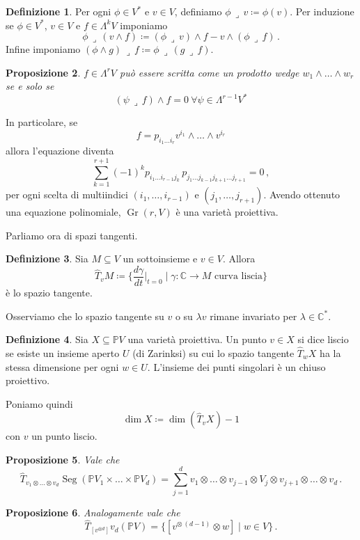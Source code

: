 \documentclass[a4paper, 11pt]{article}
\theoremstyle{definition}
\newtheorem{Def}{Definizione}[section]
\theoremstyle{plain}
\newtheorem{Prop}[Def]{Proposizione}
\newcommand{\PP}{\mathbb{P}}
\newcommand{\C}{\mathbb{C}}
\newcommand{\deff}{\coloneqq}
\DeclareMathOperator{\Gr}{Gr}
\DeclareMathOperator{\Seg}{Seg}
\begin{document}
\begin{Def}
	Per ogni $\phi \in V^\ast$ e $v \in V$, definiamo $\phi \,\lrcorner \,v \deff \phi(v)$. Per induzione se $\phi \in V^\ast$, $v \in V$ e $f \in \Lambda^k V$ imponiamo
	\[
		\phi\,\lrcorner\,(v \wedge f) \deff (\phi \,\lrcorner\, v) \wedge f - v \wedge (\phi \,\lrcorner\, f)\,.
	\]
	Infine imponiamo $(\phi \wedge g)\,\lrcorner\, f \deff \phi\,\lrcorner\,(g\, \lrcorner\, f)$.
\end{Def}
\begin{Prop}
	$f \in \Lambda^r V$ può essere scritta come un prodotto wedge $w_1 \wedge\dots\wedge w_r$ se e solo se 
	\[
		(\psi \,\lrcorner\,f) \wedge f = 0\ \forall \psi \in \Lambda^{r-1}V^*
	\]
\end{Prop}
In particolare, se 
\[
	f = p_{i_1\dots i_r}v^{i_1} \wedge \dots \wedge v^{i_r}
\] 
allora l'equazione diventa
\[
	\sum_{k=1}^{r+1}(-1)^kp_{i_1\dots i_{r-1}j_k}\,p_{j_1\dots j_{k-1}j_{k+1}\dots j_{r+1}} = 0\,,
\]
per ogni scelta di multiindici $(i_1, \dots, i_{r-1})$ e $(j_1, \dots, j_{r+1})$. Avendo ottenuto una equazione polinomiale, $\Gr(r,V)$ è una varietà proiettiva.

Parliamo ora di spazi tangenti. 
\begin{Def}
	Sia $M \subseteq V$ un sottoinsieme e $v \in V$. Allora
	\[
		\hat{T}_vM \deff \Big\{\frac{d\gamma}{dt}\Big|_{t = 0} \mid \gamma \colon \C \to M \text{ curva liscia}\Big\}
	\]
	è lo spazio tangente.
\end{Def}
Osserviamo che lo spazio tangente su $v$ o su $\lambda v$ rimane invariato per $\lambda \in \C^*$.

\begin{Def}
	Sia $X \subseteq \PP V$ una varietà proiettiva. Un punto $v \in X$ si dice liscio se esiste un insieme aperto $U$ (di Zarinksi) su cui lo spazio tangente $\hat{T}_w X$ ha la stessa dimensione per ogni $w \in U$. L'insieme dei punti singolari è un chiuso proiettivo.
\end{Def}

Poniamo quindi 
\[
	\dim X \deff \dim (\hat{T}_v X)-1
\]
con $v$ un punto liscio.

\begin{Prop}
	Vale che
	\[
		\hat{T}_{v_1\otimes \dots \otimes v_d} \Seg(\PP V_1 \times \dots \times \PP V_d) = \sum_{j =1}^d
 v_1 \otimes \dots \otimes v_{j-1}\otimes V_j\otimes v_{j+1} \otimes \dots \otimes v_d\,.
 	\]
\end{Prop}
\begin{Prop}
	Analogamente vale che
	\[
		\hat{T}_{[v^{\otimes d}]} v_d(\PP V) = \{[v^{\otimes\, (d-1)}\otimes w] \mid w \in V\}\,.
	\]
\end{Prop}
\end{document}
